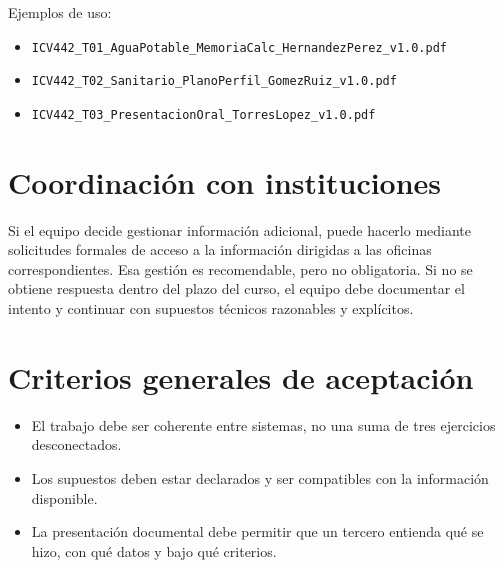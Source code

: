 \documentclass[11pt]{article}
\begin{document}
Ejemplos de uso:
\begin{itemize}
\item \texttt{ICV442\_T01\_AguaPotable\_MemoriaCalc\_HernandezPerez\_v1.0.pdf}
\item \texttt{ICV442\_T02\_Sanitario\_PlanoPerfil\_GomezRuiz\_v1.0.pdf}
\item \texttt{ICV442\_T03\_PresentacionOral\_TorresLopez\_v1.0.pdf}
\end{itemize}

\section{Coordinaci\'on con instituciones}
Si el equipo decide gestionar informaci\'on adicional, puede hacerlo mediante solicitudes formales de acceso a la informaci\'on dirigidas a las oficinas correspondientes. Esa gesti\'on es recomendable, pero no obligatoria. Si no se obtiene respuesta dentro del plazo del curso, el equipo debe documentar el intento y continuar con supuestos t\'ecnicos razonables y expl\'icitos.

\section{Criterios generales de aceptaci\'on}
\begin{itemize}
\item El trabajo debe ser coherente entre sistemas, no una suma de tres ejercicios desconectados.
\item Los supuestos deben estar declarados y ser compatibles con la informaci\'on disponible.
\item La presentaci\'on documental debe permitir que un tercero entienda qu\'e se hizo, con qu\'e datos y bajo qu\'e criterios.
\end{itemize}
\end{document}
